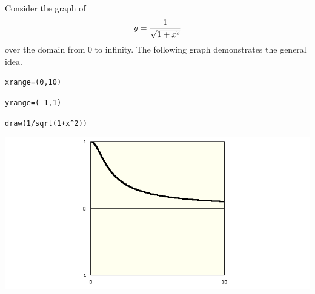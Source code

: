 
\newpage

\noindent
Consider the graph of
$$y={1\over\sqrt{1+x^2}}$$
over the domain from 0 to infinity.
The following graph demonstrates the general idea.

\medskip
\verb$xrange=(0,10)$

\verb$yrange=(-1,1)$

\verb$draw(1/sqrt(1+x^2))$

\begin{center}
\includegraphics[scale=0.4]{16.png}
\end{center}
